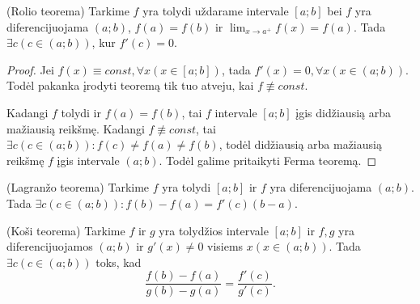 \begin{prop}
  (Rolio teorema) Tarkime $f$ yra tolydi uždarame intervale $[a; b]$
  bei $f$ yra diferencijuojama $(a; b)$, $f(a) = f(b)$ ir 
  $\lim_{x \to a^{+}} f(x) = f(a)$. Tada 
  $\exists c (c \in (a; b))$, kur $f'(c) = 0$.

  \begin{proof}
    Jei $f(x) \equiv const, \forall x (x \in [a; b])$, tada 
    $f'(x) = 0, \forall x (x \in (a; b))$. Todėl pakanka įrodyti 
    teoremą tik tuo atveju, kai $f \not\equiv const$.

    Kadangi $f$ tolydi ir $f(a) = f(b)$, tai $f$ intervale
    $[a; b]$ įgis didžiausią arba mažiausią reikšmę. Kadangi
    $f \not\equiv const$, tai 
    $\exists c (c \in (a; b)) : f(c) \neq f(a) \neq f(b)$, todėl
    didžiausią arba mažiausią reikšmę $f$ įgis intervale $(a; b)$.
    Todėl galime pritaikyti Ferma teoremą.
  \end{proof}
\end{prop}

\begin{prop}
  \label{lagran_vid}
  (Lagranžo teorema) Tarkime $f$ yra tolydi $[a; b]$ ir $f$ yra 
  diferencijuojama $(a; b)$. Tada 
  $\exists c (c \in (a; b)) : f(b) - f(a) = f'(c)(b - a)$.
\end{prop}

\begin{prop}
  \label{kosi_vid}
  (Koši teorema) Tarkime $f$ ir $g$ yra tolydžios intervale $[a;b]$ ir
  $f, g$ yra diferencijuojamos $(a; b)$ ir $g'(x) \neq 0$ visiems 
  $x (x \in (a; b))$. Tada $\exists c (c \in (a; b))$ toks, kad
  \begin{equation*}
    \frac{f(b) - f(a)}{g(b) - g(a)} = \frac{f'(c)}{g'(c)}.
  \end{equation*}
\end{prop}
